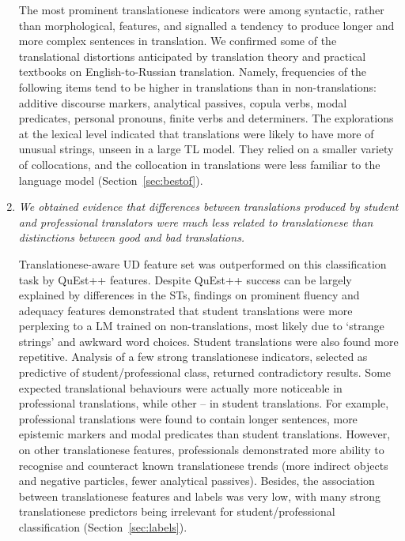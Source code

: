 \begin{enumerate}
	The most prominent translationese indicators were among syntactic, rather than morphological, features, and signalled a tendency to produce longer and more complex sentences in translation. We confirmed some of the translational distortions anticipated by translation theory and practical textbooks on English-to-Russian translation. Namely, frequencies of the following items tend to be higher in translations than in non-translations: additive discourse markers, analytical passives, copula verbs, modal predicates, personal pronouns, finite verbs and determiners.
	The explorations at the lexical level indicated that translations were likely to have more of unusual strings, unseen in a large TL model. They relied on a smaller variety of collocations, and the collocation in translations were less familiar to the language model (Section~\ref{sec:bestof}). %
	
	\item \textit{We obtained evidence that differences between translations produced by student and professional translators were much less related to translationese than distinctions between \textit{good} and \textit{bad} translations.} %
	
	Translationese-aware UD feature set was outperformed on this classification task by QuEst++ features. Despite QuEst++ success can be largely explained by differences in the STs, findings on prominent fluency and adequacy features demonstrated that student translations were more perplexing to a LM trained on non-translations, most likely due to `strange strings' and awkward word choices. Student translations were also found more repetitive. Analysis of a few strong translationese indicators, selected as predictive of student/professional class, returned contradictory results. Some expected translational behaviours were actually more noticeable in professional translations, while other -- in student translations. For example, professional translations were found to contain longer sentences, more epistemic markers and modal predicates than student translations. However, on other translationese features, professionals demonstrated more ability to recognise and counteract known translationese trends (more indirect objects and negative particles, fewer analytical passives).
	Besides, the association between translationese features and labels was very low, with many strong translationese predictors being irrelevant for student/professional classification (Section~\ref{sec:labels}).
	

\end{enumerate}

